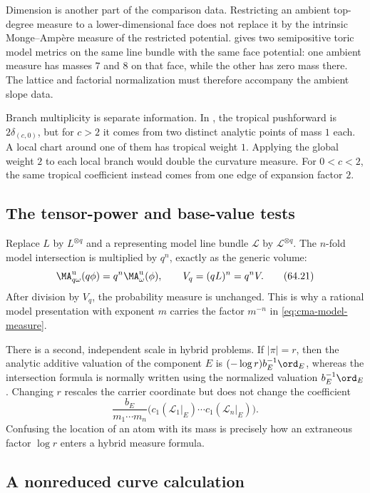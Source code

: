 Dimension is another part of the comparison data.  Restricting an ambient
top-degree measure to a lower-dimensional face does not replace it by
the intrinsic Monge--Amp\`ere measure of the restricted potential.
 gives two semipositive toric model metrics
on the same line bundle with the same face potential: one ambient measure
has masses $7$ and $8$ on that face, while the other has zero mass there.
The lattice and factorial normalization must therefore accompany the
ambient slope data.

Branch multiplicity is separate information.  In
, the tropical pushforward
is $2\delta_{(c,0)}$, but for $c>2$ it comes from two distinct analytic
points of mass $1$ each.  A local chart around one of them has tropical
weight $1$.  Applying the global weight $2$ to each local branch would
double the curvature measure.  For $0<c<2$, the same tropical coefficient
instead comes from one edge of expansion factor $2$.

\subsection{The tensor-power and base-value tests}
\label{subsec:cma-tensor-base}

Replace $L$ by $L^{\otimes q}$ and a representing model line bundle
$\mathcal L$ by $\mathcal L^{\otimes q}$.  The $n$-fold model
intersection is multiplied by $q^n$, exactly as the generic volume:
\[
 \MA^{\mathrm u}_{q\omega}(q\phi)=q^n
       \MA^{\mathrm u}_\omega(\phi),
 \qquad
 V_q=(qL)^n=q^nV.
\tag{64.21}\label{eq:cma-tensor-power-test}
\]
After division by $V_q$, the probability measure is unchanged.  This is
why a rational model presentation with exponent $m$ carries the factor
$m^{-n}$ in \eqref{eq:cma-model-measure}.

There is a second, independent scale in hybrid problems.  If
$|\pi|=r$, then the analytic additive valuation of the component $E$ is
$(-\log r)b_E^{-1}\ord_E$, whereas the intersection formula is normally
written using the normalized valuation $b_E^{-1}\ord_E$.  Changing $r$
rescales the carrier coordinate but does not change the coefficient
\[
 \frac{b_E}{m_1\cdots m_n}
 \bigl(c_1(\mathcal L_1|_E)\cdots
       c_1(\mathcal L_n|_E)\bigr).
\tag{64.22}\label{eq:cma-base-value-test}
\]
Confusing the location of an atom with its mass is precisely how an
extraneous factor $\log r$ enters a hybrid measure formula.

\subsection{A nonreduced curve calculation}
\label{subsec:cma-nonreduced-curve}

